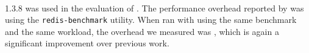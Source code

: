 \paragraph{\redis} 1.3.8 %
was used in the evaluation of \mx.  The performance
overhead reported by \mx was \mxRedis using the \lstinline`redis-benchmark`
utility. When ran with \varan using the same benchmark and the same workload,
the overhead we measured was \redisOneFollower, which is again a significant
improvement over previous work.



